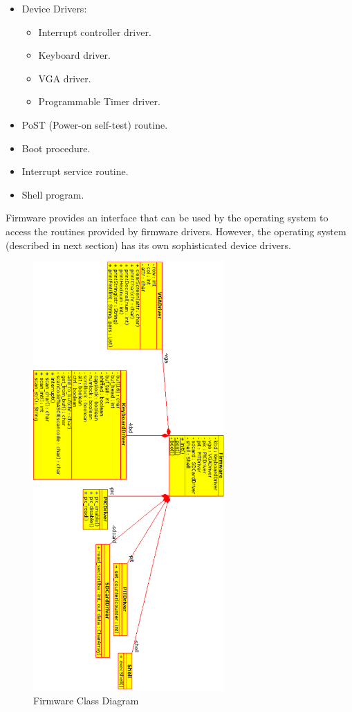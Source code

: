 \documentclass[oneside]{book}
\begin{document}
\begin{itemize}

\item Device Drivers:
    \begin{itemize}
    \item Interrupt controller driver.
    \item Keyboard driver.
    \item VGA driver.
    \item Programmable Timer driver.
    \end{itemize}
\item PoST (Power-on self-test) routine.
\item Boot procedure.
\item Interrupt service routine.
\item Shell program.

\end{itemize}

Firmware provides an interface that can be used by the operating system
to access the routines provided by firmware drivers. However, the operating
system (described in next section) has its own sophisticated device drivers.

\begin{figure}[H]
\begin{center}
\includegraphics[width=0.65\textwidth]{firmware.png}
\end{center}
\caption{Firmware Class Diagram}
\label{firmware}
\end{figure}
\end{document}
